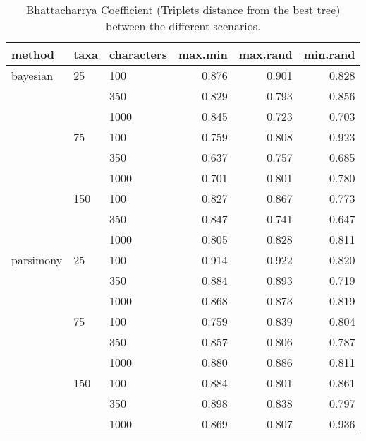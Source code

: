 \begin{table}[ht]
\centering
\begin{tabular}{lllrrr}
  \hline
method & taxa & characters & max.min & max.rand & min.rand \\ 
  \hline
bayesian & 25 & 100 & 0.876 & 0.901 & 0.828 \\ 
   &  & 350 & 0.829 & 0.793 & 0.856 \\ 
   &  & 1000 & 0.845 & 0.723 & 0.703 \\ 
   & 75 & 100 & 0.759 & 0.808 & 0.923 \\ 
   &  & 350 & 0.637 & 0.757 & 0.685 \\ 
   &  & 1000 & 0.701 & 0.801 & 0.780 \\ 
   & 150 & 100 & 0.827 & 0.867 & 0.773 \\ 
   &  & 350 & 0.847 & 0.741 & 0.647 \\ 
   &  & 1000 & 0.805 & 0.828 & 0.811 \\ 
  parsimony & 25 & 100 & 0.914 & 0.922 & 0.820 \\ 
   &  & 350 & 0.884 & 0.893 & 0.719 \\ 
   &  & 1000 & 0.868 & 0.873 & 0.819 \\ 
   & 75 & 100 & 0.759 & 0.839 & 0.804 \\ 
   &  & 350 & 0.857 & 0.806 & 0.787 \\ 
   &  & 1000 & 0.880 & 0.886 & 0.811 \\ 
   & 150 & 100 & 0.884 & 0.801 & 0.861 \\ 
   &  & 350 & 0.898 & 0.838 & 0.797 \\ 
   &  & 1000 & 0.869 & 0.807 & 0.936 \\ 
   \hline
\end{tabular}
\caption{Bhattacharrya Coefficient (Triplets distance from the best tree) between the different scenarios.} 
\label{Full_Tab_BCTrbest}
\end{table}
